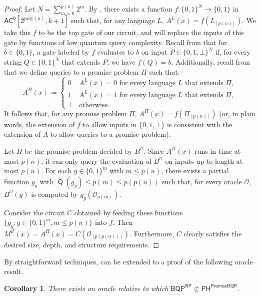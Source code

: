 \documentclass[10pt,a4paper]{article}
\newtheorem{corollary}[theorem]{Corollary}
\newcommand{\poly}{\mathrm{poly}}
\DeclareMathOperator{\Q}{\mathsf{Q}}
\begin{document}
\begin{proof}
Let $N = \sum_{m=0}^{p(n)} 2^{m}$. By , there exists a function $f: \{0,1\}^N \to \{0,1\}$ in $\mathsf{AC^0}\left[2^{\poly(n)}, k+1\right]$ such that, for any language $L$, $A^{L}(x) = f\left(L_{[p(n)]}\right)$. We take this $f$ to be the top gate of our circuit, and will replace the inputs of this gate by functions of low quantum query complexity. Recall from  that for $b \in \{0,1\}$, a gate labeled by $f$ evaluates to $b$ on input $P \in \{0,1,\bot\}^N$ if, for every string $Q \in \{0,1\}^N$ that extends $P$, we have $f(Q) = b$. Additionally, recall from  that we define queries to a promise problem $\Pi$ such that:
\[
A^\Pi(x) \coloneqq \begin{cases}
0 & A^L(x) = 0 \text{ for every language } L \text{ that extends } \Pi,\\
1 & A^L(x) = 1 \text{ for every language } L \text{ that extends } \Pi,\\
\bot & \text{otherwise}.
\end{cases}
\]
It follows that, for any promise problem $\Pi$, $A^{\Pi}(x) = f\left(\Pi_{[p(n)]}\right)$ (or, in plain words, the extension of $f$ to allow inputs in $\{0,1,\bot\}$ is consistent with the extension of $A$ to allow queries to a promise problem).

Let $\Pi$ be the promise problem decided by $B^\mathcal{O}$. Since $A^\Pi(x)$ runs in time at most $p(n)$, it can only query the evaluation of $B^\mathcal{O}$ on inputs up to length at most $p(n)$. For each $y \in \{0,1\}^{m}$ with $m \le p(n)$, there exists a partial function $g_y$ with $\Q(g_y) \le p(m) \le p(p(n))$ such that, for every oracle $\mathcal{O}$, $B^\mathcal{O}(y)$ is computed by $g_y\left(\mathcal{O}_{p(m)} \right)$.

Consider the circuit $C$ obtained by feeding these functions $\{g_y : y \in \{0,1\}^{m}, m \le p(n)\}$ into $f$. Then $M^\mathcal{O}(x) = A^{\Pi}(x) = C\left(\mathcal{O}_{[p(p(n))]}\right)$. Furthermore, $C$ clearly satisfies the desired size, depth, and structure requirements.
\end{proof}

By straightforward techniques,  can be extended to a proof of the following oracle result.

\begin{corollary}
\label{cor:bqp^np_not_in_ph^bqp}
There exists an oracle relative to which $\mathsf{BQP}^\mathsf{NP} \not\subset \mathsf{PH}^\mathsf{PromiseBQP}$.
\end{corollary}
\end{document}
